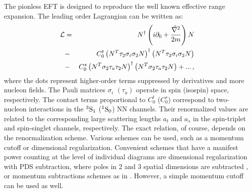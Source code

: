 \documentclass[aps,rmp,nofootinbib,twocolumn,floatfix]{revtex4}
\newcommand{\beqa}{\begin{eqnarray}}
\newcommand{\eeqa}{\end{eqnarray}}
\newcommand{\sing}{^1{\rm S}_0}
\newcommand{\trip}{^3{\rm S}_1}
\begin{document}
The pionless EFT is designed to reproduce the well known effective range 
expansion. The leading order Lagrangian can be written as:
\beqa
{\cal L}&=&N^\dagger \left(i\partial_0 +\frac{\vec{\nabla}^2}{2m}\right)N
\nonumber \\
&-&C_0^t\left(N^T \tau_2 \sigma_i \sigma_2 N\right)^\dagger\left(
N^T \tau_2 \sigma_i \sigma_2 N\right) 
\nonumber \\
&- &C_0^s\left(N^T \sigma_2 \tau_a \tau_2 N\right)^\dagger\left(
N^T \sigma_2 \tau_a \tau_2 N\right) +...\,,
\label{lagN}
\eeqa
where the dots represent higher-order terms suppressed by derivatives
and more nucleon fields. The Pauli matrices
$\sigma_i$ $(\tau_a)$ operate in spin (isospin) space, respectively.
The contact terms proportional to $C_0^t$ ($C_0^s$) correspond to 
two-nucleon interactions in the $\trip$ ($\sing$) NN channels.
Their renormalized values are related to the 
corresponding large scattering lengths $a_t$ and $a_s$
in the spin-triplet and spin-singlet channels, respectively.
The exact relation, of course, depends on the renormalization scheme.
Various schemes can be used, such as a momentum cutoff or dimensional 
regularization. Convenient schemes that have a manifest power counting
at the level of individual diagrams are dimensional regularization
with PDS subtraction, where poles in 2 and 3 spatial dimensions are subtracted
\cite{Kaplan:1998we}, or momentum subtractions schemes as in 
\cite{Gegelia:1998xr}. However, a simple momentum cutoff can be used as
well.
\end{document}
